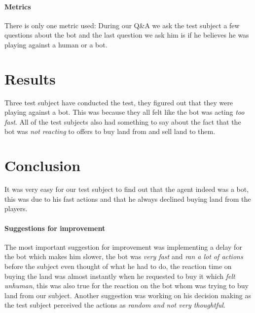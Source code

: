 \paragraph{Metrics}

There is only one metric used: During our Q\&A we ask the test subject a few questions about the bot and the last question we ask him is if he believes he was playing against a human or a bot. 

\section*{Results}

Three test subject have conducted the test, they figured out that they were playing against a bot. This was because they all felt like the bot was acting \textit{too fast}. All of the test subjects also had something to say about the fact that the bot was \textit{not reacting} to offers to buy land from and sell land to them.

\section*{Conclusion}

It was very easy for our test subject to find out that the agent indeed was a bot, this was due to his fast actions and that he always declined buying land from the players.

\paragraph{Suggestions for improvement}

The most important suggestion for improvement was implementing a delay for the bot which makes him slower, the bot was \textit{very fast} and \textit{ran a lot of actions} before the subject even thought of what he had to do, the reaction time on buying the land was almost instantly when he requested to buy it which \textit{felt unhuman}, this was also true for the reaction on the bot whom was trying to buy land from our subject. Another suggestion was working on his decision making as the test subject perceived the actions as \textit{random and not very thoughtful}.

